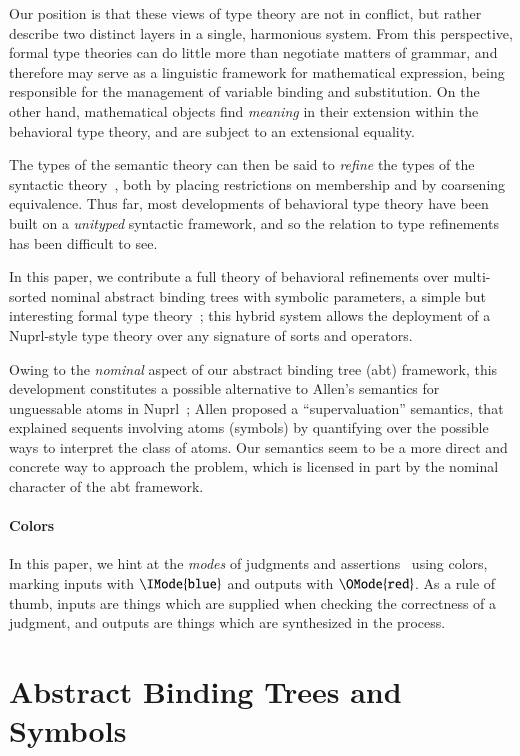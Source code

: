 \documentclass[11pt]{article}
\theoremstyle{definition}
\theoremstyle{notation}
\theoremstyle{remark}
\numberwithin{equation}{section}
\begin{document}
Our position is that these views of type theory are not in conflict, but rather
describe two distinct layers in a single, harmonious system. From this
perspective, formal type theories can do little more than negotiate matters of
grammar, and therefore may serve as a linguistic framework for mathematical
expression, being responsible for the management of variable binding and
substitution. On the other hand, mathematical objects find
\emph{meaning} in their extension within the behavioral type theory, and are
subject to an extensional equality.

The types of the semantic theory can then be said to \emph{refine} the types of
the syntactic theory~\cite{harper-davies:2014, harper-duff:2015, harper:2016},
both by placing restrictions on membership and by coarsening equivalence. Thus
far, most developments of behavioral type theory have been built on a
\emph{unityped} syntactic framework, and so the relation to type refinements
has been difficult to see.

In this paper, we contribute a full theory of behavioral refinements over
multi-sorted nominal abstract binding trees with symbolic parameters, a simple
but interesting formal type theory~\cite{harper:2016, sterling-morrison:2015};
this hybrid system allows the deployment of a Nuprl-style type theory over any
signature of sorts and operators.

Owing to the \emph{nominal} aspect of our abstract binding tree (abt) framework, this
development constitutes a possible alternative to Allen's semantics for
unguessable atoms in Nuprl~\cite{allen:2006}; Allen proposed a
``supervaluation'' semantics, that explained sequents involving atoms (symbols)
by quantifying over the possible ways to interpret the class of atoms. Our
semantics seem to be a more direct and concrete way to approach the problem,
which is licensed in part by the nominal character of the abt framework.

\ifcolored%
\paragraph{Colors}
In this paper, we hint at the \emph{modes} of judgments and
assertions~\cite{harper:2016} using colors, marking inputs with
$\IMode{\texttt{blue}}$ and outputs with $\OMode{\texttt{red}}$. As a rule of
thumb, inputs are things which are supplied when checking the correctness of a
judgment, and outputs are things which are synthesized in the process. \fi


\section{Abstract Binding Trees and Symbols}
\end{document}
